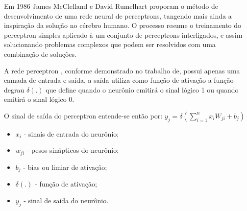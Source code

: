 	  	    Em 1986 James McClelland e David Rumelhart proporam o método de desenvolvimento de uma rede neural de perceptrons, tangendo mais ainda a inspiração da solução no cérebro humano. O processo resume o treinamento do perceptron simples aplicado à um conjunto de perceptrons interligados, e assim solucionando problemas complexos que podem ser resolvidos com uma combinação de soluções.
	  	  
  	  	  \begin{figure}[H]
  	  	   \end{figure}

            A rede perceptron , conforme demonstrado no trabalho de\cite{Flavia2014}, possui apenas uma camada de entrada e saída, a saída utiliza como função de ativação a função degrau $ \delta(.) $ que define quando o neurônio emitirá o sinal lógico 1 ou quando emitirá o sinal lógico 0.

            O sinal de saída do perceptron entende-se então por:
            $y_j= \delta(\sum_{i=1}^{n}x_i W_{ji}+b_j)$
            \begin{itemize}
            	\item $ x_i $ - sinais de entrada do neurônio;
            	\item $ w_{ji} $ - pesos sinápticos do neurônio;
            	\item $ b_j $ - bias ou limiar de ativação;
            	\item $ \delta(.) $ - função de ativação;
            	\item $ y_j $ - sinal de saída do neurônio.
            \end{itemize}
			
            \begin{figure}[H]
            \end{figure}
			
